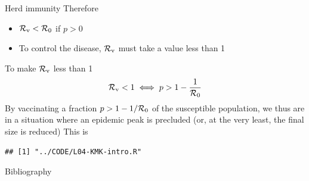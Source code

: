 \documentclass[aspectratio=169]{beamer}\usepackage[]{graphicx}\usepackage[]{xcolor}
\makeatletter
\newenvironment{kframe}{%
 \def\at@end@of@kframe{}%
 \ifinner\ifhmode%
  \def\at@end@of@kframe{\end{minipage}}%
  \begin{minipage}{\columnwidth}%
 \fi\fi%
 \def\FrameCommand##1{\hskip\@totalleftmargin \hskip-\fboxsep
 \colorbox{shadecolor}{##1}\hskip-\fboxsep
     \hskip-\linewidth \hskip-\@totalleftmargin \hskip\columnwidth}%
 \MakeFramed {\advance\hsize-\width
   \@totalleftmargin\z@ \linewidth\hsize
   \@setminipage}}%
 {\par\unskip\endMakeFramed%
 \at@end@of@kframe}
\newenvironment{knitrout}{}{} %
\makeatother
\begin{document}
\begin{frame}{Herd immunity}
  Therefore
  \begin{itemize}
    \item $\mathcal{R}_{\text{v}}<\mathcal{R}_0$ if $p>0$ 
    \item To control the disease, $\mathcal{R}_{\text{v}}$ must take a value less than 1
  \end{itemize}
  \vfill
To make $\mathcal{R}_{\text{v}}$ less than 1
  \begin{equation}\label{eq:herd_immunity}
    \mathcal{R}_{\text{v}}<1 \iff p> 1-\frac{1}{\mathcal{R}_0}
  \end{equation}
  \vfill
  By vaccinating a fraction $p>1-1/\mathcal{R}_0$ of the susceptible population, we thus are in a situation where an epidemic peak is precluded (or, at the very least, the final size is reduced)
  \vfill
  This is 
\end{frame}


\begin{knitrout}
\color{fgcolor}\begin{kframe}
\begin{verbatim}
## [1] "../CODE/L04-KMK-intro.R"
\end{verbatim}
\end{kframe}
\end{knitrout}



\begin{frame}[allowframebreaks]{Bibliography}


\end{frame}
\end{document}
